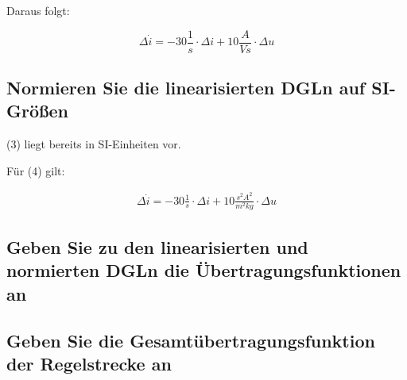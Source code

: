 \documentclass[a4paper,10pt,left=1.5cm,right=1.5cm,top=1.5cm,bottom=1.5cm]{article}
\begin{document}
Daraus folgt:

\begin{equation}
  \Delta \dot{i} = -30 \frac{1}{s} \cdot \Delta i + 10 \frac{A}{Vs} \cdot \Delta u
\end{equation}

\subsection{Normieren Sie die linearisierten DGLn auf SI-Größen}

(3) liegt bereits in SI-Einheiten vor.

Für (4) gilt:

\begin{eqnarray}
  \Delta \dot{i} = -30 \frac{1}{s} \cdot \Delta i + 10 \frac{s^2 A^2}{m^2 kg} \cdot \Delta u
\end{eqnarray}

\subsection{Geben Sie zu den linearisierten und normierten DGLn die Übertragungsfunktionen an}

\subsection{Geben Sie die Gesamtübertragungsfunktion der Regelstrecke an}
\end{document}
